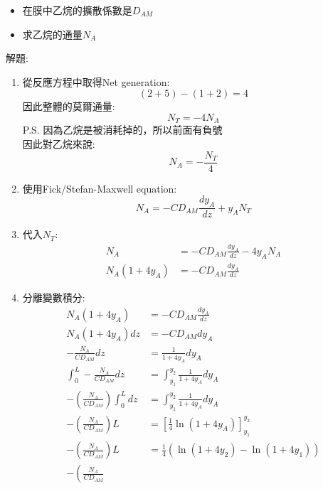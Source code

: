 \documentclass[../main.tex]{subfiles}
\begin{document}
\begin{itemize}
\begin{itemize}
    \item 在膜中乙烷的擴散係數是$D_{AM}$
    \item 求乙烷的通量$N_A$
  \end{itemize}
  解題:
  \begin{enumerate}
    \item 從反應方程中取得Net generation:
    \begin{equation}
      (2+5) - (1+2) = 4
    \end{equation}
    因此整體的莫爾通量:
    \begin{equation}
      N_T = -4 N_A
    \end{equation}
    P.S. 因為乙烷是被消耗掉的，所以前面有負號\\
    因此對乙烷來說:
    \begin{equation}
      N_A = -\frac{N_T}{4}
    \end{equation}
    \item 使用Fick/Stefan-Maxwell equation:
    \begin{equation}
      N_A = -C D_{AM} \frac{dy_A}{dz} + y_A N_T
    \end{equation}
    \item 代入$N_T$:
    \begin{align}
      N_A &= -C D_{AM} \frac{dy_A}{dz} - 4 y_A N_A \nonumber\\
      N_A(1+4y_A) &= -C D_{AM} \frac{dy_A}{dz}
    \end{align}
    \item 分離變數積分:
    \begin{align}
      N_A(1+4y_A) &= -C D_{AM} \frac{dy_A}{dz}\nonumber\\
      N_A(1+4y_A) dz &= -C D_{AM} dy_A\nonumber\\
      -\frac{N_A}{C D_{AM}} dz &= \frac{1}{1+4y_A} dy_A\nonumber\\
      \int_0^L -\frac{N_A}{C D_{AM}} dz &= \int_{y_1}^{y_2} \frac{1}{1+4y_A} dy_A\nonumber\\
      -\left(
        \frac{N_A}{C D_{AM}}
      \right) \int_0^L dz &= \int_{y_1}^{y_2} \frac{1}{1+4y_A} dy_A\nonumber\\
      -\left(
        \frac{N_A}{C D_{AM}}
      \right) L &= \left[
        \frac{1}{4} \ln(1+4y_A)
      \right]_{y_1}^{y_2}\nonumber\\
      -\left(
        \frac{N_A}{C D_{AM}}
      \right) L &= \frac{1}{4} \left(
        \ln(1+4y_2) - \ln(1+4y_1)
      \right)\nonumber\\
      -\left(
        \frac{N_A}{C D_{AM}}

\end{align}
\end{enumerate}
\end{itemize}
\end{document}
